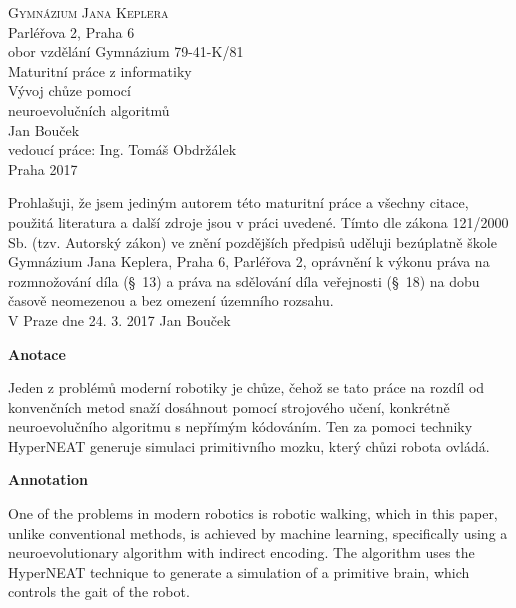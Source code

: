 \documentclass[a4]{article}
\begin{document}
 
 
\begin{titlepage} 
\begin{center} 
{\huge\textsc{Gymnázium Jana Keplera}\\}
{\large{Parléřova 2, Praha 6}}\\
{\large{obor vzdělání Gymnázium 79-41-K/81}\\[5cm]} 
{\Large{Maturitní práce z informatiky}\\[0.2cm]}
{\Huge{Vývoj chůze pomocí\\neuroevolučních algoritmů}}\\\vfill
{\Large{Jan Bouček}\\} 
{\large{vedoucí práce: Ing. Tomáš Obdržálek}\\} 
{\large{Praha 2017}} 
\end{center} 
\end{titlepage} 
 
\newpage 
Prohlašuji, že jsem jediným autorem této maturitní práce a všechny citace, použitá literatura a další zdroje jsou v práci uvedené. Tímto dle zákona 121/2000 Sb. (tzv. Autorský zákon) ve znění pozdějších předpisů uděluji bezúplatně škole Gymnázium Jana Keplera, Praha 6, Parléřova 2, oprávnění k výkonu práva na rozmnožování díla (§~13) a práva na sdělování díla veřejnosti (§~18) na dobu časově neomezenou a bez omezení územního rozsahu.\\[0.7cm] 
\vspace{10cm} 
{\large{V Praze dne 24. 3. 2017} \hfill Jan Bouček} 
\newpage 
\tableofcontents
\newpage
{\Large\textbf{Anotace}\par}
Jeden z problémů moderní robotiky je chůze, čehož se tato práce na rozdíl od konvenčních metod snaží dosáhnout pomocí strojového učení, konkrétně neuroevolučního algoritmu s nepřímým kódováním. Ten za pomoci techniky HyperNEAT generuje simulaci primitivního mozku, který chůzi robota ovládá.\par 

{\Large\textbf{Annotation}\par}
One of the problems in modern robotics is robotic walking, which in this paper, unlike conventional methods, is achieved by machine learning, specifically using a neuroevolutionary algorithm with indirect encoding. The algorithm uses the HyperNEAT technique to generate a simulation of a primitive brain, which controls the gait of the robot.\par  
\end{document}
